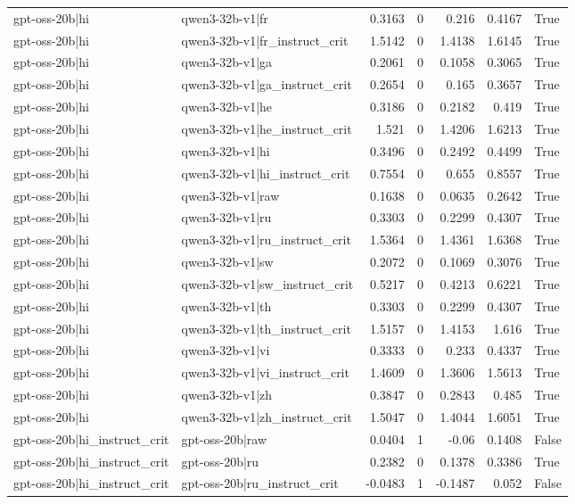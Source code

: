 \begin{table}
\begin{tabular}{l l r r r r l}
gpt-oss-20b|hi & qwen3-32b-v1|fr & 0.3163 & 0 & 0.216 & 0.4167 & True \\
gpt-oss-20b|hi & qwen3-32b-v1|fr_instruct_crit & 1.5142 & 0 & 1.4138 & 1.6145 & True \\
gpt-oss-20b|hi & qwen3-32b-v1|ga & 0.2061 & 0 & 0.1058 & 0.3065 & True \\
gpt-oss-20b|hi & qwen3-32b-v1|ga_instruct_crit & 0.2654 & 0 & 0.165 & 0.3657 & True \\
gpt-oss-20b|hi & qwen3-32b-v1|he & 0.3186 & 0 & 0.2182 & 0.419 & True \\
gpt-oss-20b|hi & qwen3-32b-v1|he_instruct_crit & 1.521 & 0 & 1.4206 & 1.6213 & True \\
gpt-oss-20b|hi & qwen3-32b-v1|hi & 0.3496 & 0 & 0.2492 & 0.4499 & True \\
gpt-oss-20b|hi & qwen3-32b-v1|hi_instruct_crit & 0.7554 & 0 & 0.655 & 0.8557 & True \\
gpt-oss-20b|hi & qwen3-32b-v1|raw & 0.1638 & 0 & 0.0635 & 0.2642 & True \\
gpt-oss-20b|hi & qwen3-32b-v1|ru & 0.3303 & 0 & 0.2299 & 0.4307 & True \\
gpt-oss-20b|hi & qwen3-32b-v1|ru_instruct_crit & 1.5364 & 0 & 1.4361 & 1.6368 & True \\
gpt-oss-20b|hi & qwen3-32b-v1|sw & 0.2072 & 0 & 0.1069 & 0.3076 & True \\
gpt-oss-20b|hi & qwen3-32b-v1|sw_instruct_crit & 0.5217 & 0 & 0.4213 & 0.6221 & True \\
gpt-oss-20b|hi & qwen3-32b-v1|th & 0.3303 & 0 & 0.2299 & 0.4307 & True \\
gpt-oss-20b|hi & qwen3-32b-v1|th_instruct_crit & 1.5157 & 0 & 1.4153 & 1.616 & True \\
gpt-oss-20b|hi & qwen3-32b-v1|vi & 0.3333 & 0 & 0.233 & 0.4337 & True \\
gpt-oss-20b|hi & qwen3-32b-v1|vi_instruct_crit & 1.4609 & 0 & 1.3606 & 1.5613 & True \\
gpt-oss-20b|hi & qwen3-32b-v1|zh & 0.3847 & 0 & 0.2843 & 0.485 & True \\
gpt-oss-20b|hi & qwen3-32b-v1|zh_instruct_crit & 1.5047 & 0 & 1.4044 & 1.6051 & True \\
gpt-oss-20b|hi_instruct_crit & gpt-oss-20b|raw & 0.0404 & 1 & -0.06 & 0.1408 & False \\
gpt-oss-20b|hi_instruct_crit & gpt-oss-20b|ru & 0.2382 & 0 & 0.1378 & 0.3386 & True \\
gpt-oss-20b|hi_instruct_crit & gpt-oss-20b|ru_instruct_crit & -0.0483 & 1 & -0.1487 & 0.052 & False \\

\end{tabular}
\end{table}
